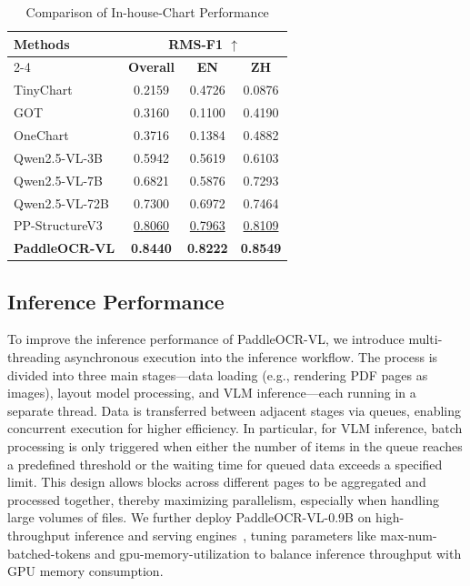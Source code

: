 \documentclass[11pt, a4paper,logo,  copyright, nonumbering]{paddleocr}
\begin{document}
\begin{table}[H]
\centering
\fontsize{7}{7}\selectfont

\setlength{\tabcolsep}{8pt}
 \renewcommand{\arraystretch}{1.2}
\begin{tabular}{@{} l| c c c @{}}
\toprule
\multirow{2}{*}{\textbf{Methods}} & \multicolumn{3}{c}{\textbf{RMS-F1 $\uparrow$}} \\
\cline{2-4}
& \textbf{Overall} & \textbf{EN} & \textbf{ZH} \\
\midrule
TinyChart~\cite{zhang2024tinychart}      & 0.2159          & 0.4726          & 0.0876 \\

GOT~\cite{wei2024general}              & 0.3160          & 0.1100          & 0.4190 \\
OneChart~\cite{onechart}      & 0.3716          & 0.1384          & 0.4882 \\
Qwen2.5-VL-3B~\cite{bai2025qwen2}   & 0.5942          & 0.5619          & 0.6103 \\
Qwen2.5-VL-7B~\cite{bai2025qwen2}    & 0.6821          & 0.5876          & 0.7293 \\
Qwen2.5-VL-72B~\cite{bai2025qwen2}    & 0.7300          & 0.6972          & 0.7464 \\


PP-StructureV3~\cite{cui2025paddleocr}   & \cellcolor{cyan!15}\underline{0.8060}          & \cellcolor{cyan!15}\underline{0.7963}         & \cellcolor{cyan!15}\underline{0.8109} \\
\textbf{PaddleOCR-VL}     & \cellcolor{red!15}\textbf {0.8440}          & \cellcolor{red!15}\textbf {0.8222}          & \cellcolor{red!15}\textbf {0.8549} \\
\bottomrule
\end{tabular}
\caption{Comparison of In-house-Chart Performance}
\label{tab:rms_f1_performance}
\end{table}


\subsection{Inference Performance}


To improve the inference performance of PaddleOCR-VL, we introduce multi-threading asynchronous execution into the inference workflow. The process is divided into three main stages---data loading (e.g., rendering PDF pages as images), layout model processing, and VLM inference---each running in a separate thread. Data is transferred between adjacent stages via queues, enabling concurrent execution for higher efficiency. In particular, for VLM inference, batch processing is only triggered when either the number of items in the queue reaches a predefined threshold or the waiting time for queued data exceeds a specified limit. This design allows blocks across different pages to be aggregated and processed together, thereby maximizing parallelism, especially when handling large volumes of files. We further deploy PaddleOCR-VL-0.9B on high-throughput inference and serving engines~\cite{kwon2023efficient,zheng2024sglang,PaddlePaddle_FastDeploy}, tuning parameters like max-num-batched-tokens and gpu-memory-utilization to balance inference throughput with GPU memory consumption.
\end{document}
